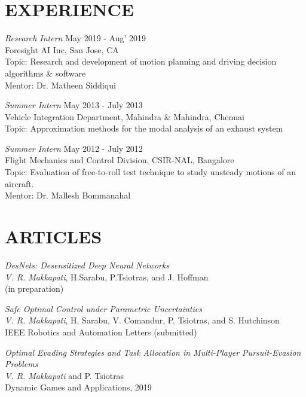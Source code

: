 \documentclass[margin, 10pt]{res} %
\begin{document}
\begin{resume}
\section{EXPERIENCE}

{\sl Research Intern} \hfill May 2019 - Aug' 2019 \\
Foresight AI Inc, San Jose, CA \\
Topic: Research and development of motion planning and driving decision algorithms \& software\\
Mentor: Dr. Matheen Siddiqui

{\sl Summer Intern} \hfill May 2013 - July 2013 \\
Vehicle Integration Department, Mahindra \& Mahindra, Chennai \\
Topic: Approximation methods for the modal analysis of an exhaust system

{\sl Summer Intern} \hfill May 2012 - July 2012 \\
Flight Mechanics and Control Division, CSIR-NAL, Bangalore \\
Topic: Evaluation of free-to-roll test technique to study unsteady motions of an aircraft. \\
Mentor: Dr. Mallesh Bommanahal


\section{ARTICLES} 

{\sl DesNets: Desensitized Deep Neural Networks}\\
\textit{V. R. Makkapati}, H.Sarabu, P.Tsiotras, and J. Hoffman \\
(in preparation)

{\sl Safe Optimal Control under Parametric Uncertainties}\\
\textit{V. R. Makkapati}, H. Sarabu, V. Comandur, P. Tsiotras, and S. Hutchinson \\
IEEE Robotics and Automation Letters (submitted)

{\sl Optimal Evading Strategies and Task Allocation in Multi-Player Pursuit-Evasion Problems} \\
\textit{V. R. Makkapati} and P. Tsiotras \\
Dynamic Games and Applications, 2019


\end{resume}
\end{document}
